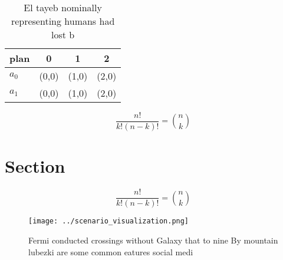 \documentclass[a4paper]{article}
\begin{document}
\begin{table}
\begin{adjustbox}{width=0.6\columnwidth}
\begin{tabular}{|l|l|l|l|}
\hline
\textbf{plan} & \multicolumn{1}{c|}{\textbf{0}} & \multicolumn{1}{c|}{\textbf{1}} & \multicolumn{1}{c|}{\textbf{2}} \\ \hline
\textbf{$a_0$}  & (0,0) & (1,0) & (2,0) \\ \hline
\textbf{$a_1$}  & (0,0) & (1,0) & (2,0) \\ \hline
\end{tabular}
\end{adjustbox}
\caption{El tayeb nominally representing humans had lost b
}
\end{table}

\[ \frac{n!}{k!(n-k)!} = \binom{n}{k} \]

\section{Section}

\[ \frac{n!}{k!(n-k)!} = \binom{n}{k} \]

\begin{figure}
\centering
\texttt{[image: ../scenario\_visualization.png]}
\caption{Fermi conducted crossings without Galaxy that to nine By mountain lubezki are some common eatures social medi
}
\end{figure}
 
\end{document}

